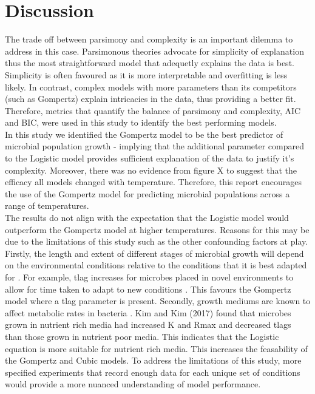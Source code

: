 \documentclass[11pt]{article}
\begin{document}
\section{Discussion}

The trade off between parsimony and complexity is an important dilemma to address in this case. Parsimonous theories advocate for simplicity of explanation \cite{Coelho2019} thus the most straightforward model that adequetly explains the data is best. Simplicity is often favoured as it is more interpretable and overfitting is less likely. In contrast, complex models with more parameters than its competitors (such as Gompertz) explain intricacies in the data, thus providing a better fit. Therefore, metrics that quantify the balance of parsimony and complexity, AIC and BIC, were used in this study to identify the best performing models.\\

In this study we identified the Gompertz model to be the best predictor of microbial population growth - implying that the additional parameter compared to the Logistic model provides sufficient explanation of the data to justify it's complexity. Moreover, there was no evidence from figure X to suggest that the efficacy all models changed with temperature. Therefore, this report encourages the use of the Gompertz model for predicting microbial populations across a range of temperatures. \\

The results do not align with the expectation that the Logistic model would outperform the Gompertz model at higher temperatures. Reasons for this may be due to the limitations of this study such as the other confounding factors at play. Firstly, the length and extent of different stages of microbial growth will depend on the environmental conditions relative to the conditions that it is best adapted for \cite{Dey2020}. For example, tlag increases for microbes placed in novel environments to allow for time taken to adapt to new conditions \cite{Rolfe2012}. This favours the Gompertz model where a tlag parameter is present. Secondly, growth mediums are known to affect metabolic rates in bacteria \cite{KIM201764}. Kim and Kim (2017) found that microbes grown in nutrient rich media had increased K and Rmax and decreased tlags than those grown in nutrient poor media. This indicates that the Logistic equation is more suitable for nutrient rich media.  This increases the feasability of the Gompertz and Cubic models. To address the limitations of this study, more specified experiments that record enough data for each unique set of conditions would provide a more nuanced understanding of model performance.\\
\end{document}
